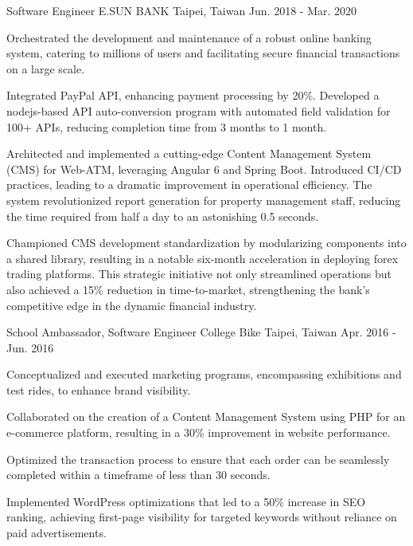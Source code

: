 \begin{cventries}
  \cventry
    {Software Engineer} %
    {E.SUN BANK} %
    {Taipei, Taiwan} %
    {Jun. 2018 - Mar. 2020} %
    {
      \begin{cvitems} %
        \item {Orchestrated the development and maintenance of a robust online banking system, catering to millions of users and facilitating secure financial transactions on a large scale.}
        \item {Integrated PayPal API, enhancing payment processing by 20\%. Developed a nodejs-based API auto-conversion program with automated field validation for 100+ APIs, reducing completion time from 3 months to 1 month.}
        \item {Architected and implemented a cutting-edge Content Management System (CMS) for Web-ATM, leveraging Angular 6 and Spring Boot. Introduced CI/CD practices, leading to a dramatic improvement in operational efficiency. The system revolutionized report generation for property management staff, reducing the time required from half a day to an astonishing 0.5 seconds.}
        \item {Championed CMS development standardization by modularizing components into a shared library, resulting in a notable six-month acceleration in deploying forex trading platforms. This strategic initiative not only streamlined operations but also achieved a 15\% reduction in time-to-market, strengthening the bank's competitive edge in the dynamic financial industry.}
      \end{cvitems}
    }

  \cventry
    {School Ambassador, Software Engineer} %
    {College Bike} %
    {Taipei, Taiwan} %
    {Apr. 2016 - Jun. 2016} %
    {
      \begin{cvitems} %
        \item {Conceptualized and executed marketing programs, encompassing exhibitions and test rides, to enhance brand visibility.}
        \item {Collaborated on the creation of a Content Management System using PHP for an e-commerce platform, resulting in a 30\% improvement in website performance.}
        \item {Optimized the transaction process to ensure that each order can be seamlessly completed within a timeframe of less than 30 seconds.}
        \item {Implemented WordPress optimizations that led to a 50\% increase in SEO ranking, achieving first-page visibility for targeted keywords without reliance on paid advertisements.}
      \end{cvitems}
    }


\end{cventries}
